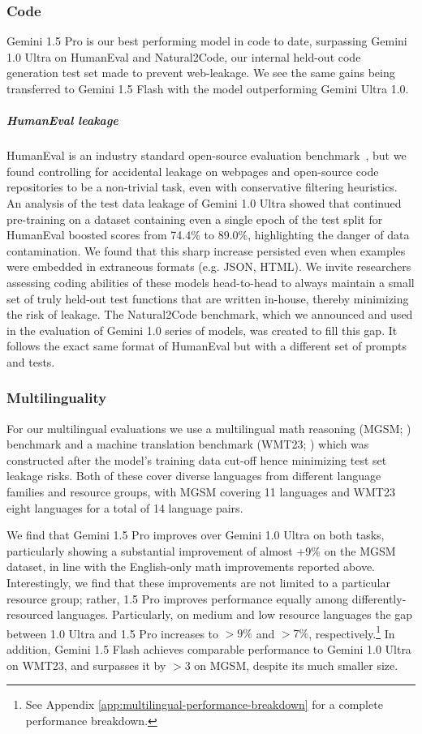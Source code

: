 \subsubsection{Code}
\label{sec:coding}

Gemini 1.5 Pro is our best performing model in code to date, surpassing Gemini 1.0 Ultra on HumanEval and Natural2Code, our internal held-out code generation test set made to prevent web-leakage. We see the same gains being transferred to Gemini 1.5 Flash with the model outperforming Gemini Ultra 1.0. 

\subparagraph{HumanEval leakage} HumanEval is an industry standard open-source evaluation benchmark~\citep{chen2021evaluating}, but we found controlling for accidental leakage on webpages and open-source code repositories to be a non-trivial task, even with conservative filtering heuristics. An analysis of the test data leakage of Gemini 1.0 Ultra showed that continued pre-training on a dataset containing even a single epoch of the test split for HumanEval boosted scores from 74.4\% to 89.0\%, highlighting the danger of data contamination. We found that this sharp increase persisted even when examples were embedded in extraneous formats (e.g. JSON, HTML). We invite researchers assessing coding abilities of these models head-to-head to always maintain a small set of truly held-out test functions that are written in-house, thereby minimizing the risk of leakage. The Natural2Code benchmark, which we announced and used in the evaluation of Gemini 1.0 series of models, was created to fill this gap. It follows the exact same format of HumanEval but with a different set of prompts and tests.

\subsubsection{Multilinguality}
\label{sec:multilinguality}

For our multilingual evaluations we use a multilingual math reasoning (MGSM; \citealp{mgsm}) benchmark and  a machine translation benchmark (WMT23; \citealp{kocmi-etal-2023-findings}) which was constructed after the model's training data cut-off hence minimizing test set leakage risks. Both of these cover diverse languages from different language families and resource groups, with MGSM covering 11 languages and WMT23 eight languages for a total of 14 language pairs.

We find that Gemini 1.5 Pro improves over Gemini 1.0 Ultra on both tasks, particularly showing a substantial improvement of almost +9\% on the MGSM dataset, in line with the English-only math improvements reported above. Interestingly, we find that these improvements are not limited to a particular resource group; rather, 1.5 Pro improves performance equally among differently-resourced languages.  Particularly, on medium and low resource languages the gap between 1.0 Ultra and 1.5 Pro increases to $>9\%$ and $>7\%$, respectively.\footnote{See Appendix \ref{app:multilingual-performance-breakdown} for a complete performance breakdown.} In addition, Gemini 1.5 Flash achieves comparable performance to Gemini 1.0 Ultra on WMT23, and surpasses it by $>3$ on MGSM, despite its much smaller size. 

